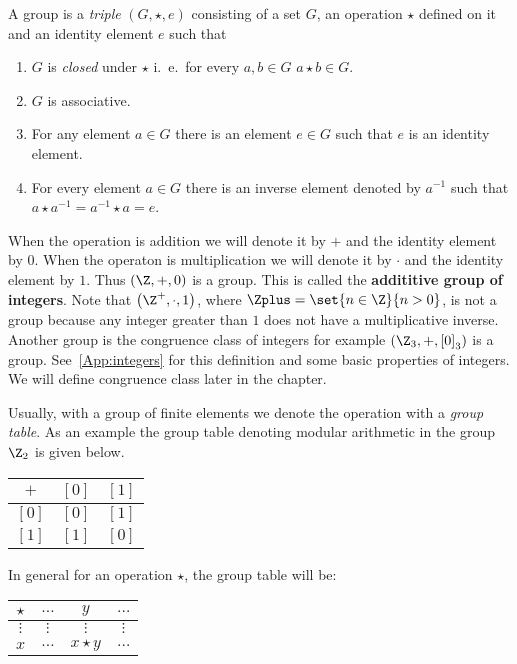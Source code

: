 \begin{Definition}
    A group is a \emph{triple} $\left(G,\star,e\right)$ consisting of a set $G$, an operation
    $\star$ defined on it and an identity element $e$ such that 
    \begin{enumerate}
	\item $G$ is \emph{closed} under $\star$ i.~e.~for every $a,b \in G$ $a \star b \in G$.
	\item $G$ is associative.
	\item For any element $a \in G$ there is an element $e \in G$ such that $e$ is an identity
	    element.
	\item For every element $a \in G$ there is an inverse element denoted by $a^{-1}$ such that
	    $a \star a^{-1} = a^{-1} \star a = e$.
    \end{enumerate}
\end{Definition}

When the operation is addition we will denote it by $+$ and the identity element by $0$.
When the operaton is multiplication we will denote it by $\cdot$ and the identity element by $1$.
Thus $\left(\Z,+,0\right)$ is a group. This is called the \textbf{addititive group of integers}. 
Note that $\left(\Z^{+},\cdot,1\right)$, where $\Zplus = \set{n\in\Z}{n > 0}$, is not a group
because any integer greater than $1$ does not have a multiplicative inverse. Another group is the
congruence class of integers for example $\left(\Z_{3},+,{\left[0\right]}_{3}\right)$ is a group.
See~\ref{App:integers} for this definition and some basic properties of integers. We will define congruence
class later in the chapter.

Usually, with a group of finite elements we denote the operation with a \emph{group table}. As an
example the group table denoting modular arithmetic in the group $\Z_{2}$ is given below.

\begin{tabular}{ccc}
\toprule
$+$    & $\left[0\right]$ & $\left[1\right]$  \\
\midrule
$\left[0\right]$      & $\left[0\right]$    & $\left[1\right]$      \\
$\left[1\right]$      & $\left[1\right]$    & $\left[0\right]$       \\
\bottomrule
\end{tabular}

In general for an operation $\star$, the group table will be:
\begin{tabular}{cccc}
\toprule
$\star$    & $\ldots$ & $y$ & $\ldots$  \\
\midrule
$\vdots$      & $\vdots$    & $\vdots$  & $\vdots$     \\
$x$      & $\ldots$    & $x \star y$  & $\ldots$      \\
\bottomrule
\end{tabular}


